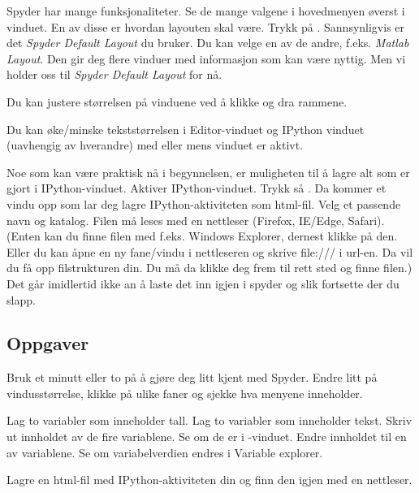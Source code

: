 Spyder har mange funksjonaliteter. Se de mange valgene i hovedmenyen øverst i vinduet. En av disse er hvordan layouten skal være. Trykk på \usnsubmenusep{}. Sannsynligvis er det \emph{Spyder Default Layout} du bruker. Du kan velge en av de andre, f.eks. {\em Matlab Layout}. Den gir deg flere vinduer med informasjon som kan være nyttig. Men vi holder oss til \emph{Spyder Default Layout} for nå.

Du kan justere størrelsen på vinduene ved å klikke og dra rammene.

Du kan øke/minske tekststørrelsen i Editor-vinduet og IPython vinduet (uavhengig av hverandre) med  eller  mens vinduet er aktivt.

Noe som kan være praktisk nå i begynnelsen, er muligheten til å lagre alt som er gjort i IPython-vinduet. Aktiver IPython-vinduet. Trykk så . Da kommer et vindu opp som lar deg lagre IPython-aktiviteten som html-fil. Velg et passende navn og katalog. Filen må leses med en nettleser (Firefox, IE/Edge, Safari). (Enten kan du finne filen med f.eks. Windows Explorer, dernest klikke på den. Eller du kan åpne en ny fane/vindu i nettleseren og skrive file:/// i url-en. Da vil du få opp filstrukturen din. Du må da klikke deg frem til rett sted og finne filen.) Det går imidlertid ikke an å laste det inn igjen i spyder og slik fortsette der du slapp. 

\subsection{Oppgaver}

\begin{exercise}
Bruk et minutt eller to på å gjøre deg litt kjent med Spyder. Endre litt på vindusstørrelse, klikke på ulike faner og sjekke hva menyene inneholder.
\end{exercise}
\begin{exercise}
Lag to variabler som inneholder tall. Lag to variabler som inneholder tekst. Skriv ut innholdet av de fire variablene. Se om de er i -vinduet. Endre innholdet til en av variablene. Se om variabelverdien endres i Variable explorer.
\end{exercise}
\begin{exercise}
Lagre en html-fil med IPython-aktiviteten din og finn den igjen med en nettleser.
\end{exercise}

